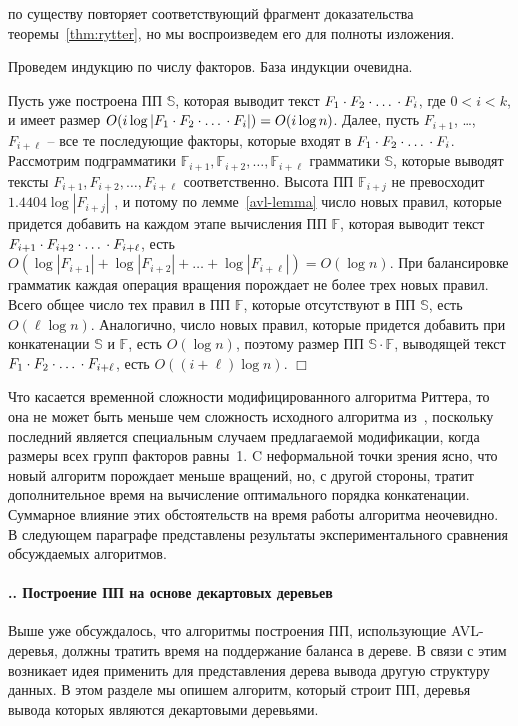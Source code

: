 ﻿\documentclass[11pt]{article}
\theoremstyle{remark}
\newcommand{\qqed}{\hfill$\Box$}
\newenvironment{proof1}{\trivlist\item[\hskip\labelsep{\bf Доказательство}] }{\qqed\endtrivlist}
\newcommand{\subsectionnew}[1]{
    \addtocounter{subsection}{1}
    \paragraph*{\arabic{section}.\arabic{subsection}. #1}
}
\newcommand{\slp}[1]{\mathbb{#1}}
\newcommand{\tuple}[4]{
    #1_{#2}, #1_{#3}, \dots, #1_{#4}
}
\newcommand{\concat}[4]{
    #1_{#2} \cdot #1_{#3} \cdot \mbox{\dots} \cdot #1_{#4}
}
\begin{document}
\begin{proof1} по существу повторяет соответствующий фрагмент доказательства теоремы~\ref{thm:rytter}, но мы воспроизведем его для полноты
изложения.

Проведем индукцию по числу факторов. База индукции очевидна.

Пусть уже построена ПП $\slp{S}$, которая выводит текст $\concat{F}{1}{2}{i}$, где $0 < i < k$, и имеет размер $O(i \log
|\concat{F}{1}{2}{i}|)=O(i \log n)$. Далее, пусть $F_{i+1}$, \dots, $F_{i+\ell}$ -- все те последующие факторы, которые входят в
$\concat{F}{1}{2}{i}$. Рассмотрим подграмматики $\tuple{\slp{F}}{i+1}{i+2}{i+\ell}$ грамматики $\slp{S}$, которые выводят тексты
$\tuple{F}{i+1}{i+2}{i+\ell}$ соответственно. Высота ПП $\slp{F}_{i+j}$ не превосходит $1.4404\log|F_{i+j}|$ \cite[теорема~6.2.3А]{Knuth},
и потому по лемме~\ref{avl-lemma} число новых правил, которые придется добавить на каждом этапе вычисления ПП $\slp{F}$, которая выводит
текст $\concat{F}{i+1}{i+2}{i+\ell}$, есть $O\left(\log |F_{i+1}| + \log |F_{i+2}| + \dots + \log |F_{i+\ell}|\right)=O(\log n)$. При
балансировке грамматик каждая операция вращения порождает не более трех новых правил. Всего общее число тех правил в ПП $\slp{F}$, которые
отсутствуют в ПП $\slp{S}$, есть $O(\ell\log n)$. Аналогично, число новых правил, которые придется добавить при конкатенации $\slp{S}$ и
$\slp{F}$, есть $O(\log n)$, поэтому размер ПП $\slp{S}\cdot\slp{F}$, выводящей текст $\concat{F}{1}{2}{i+\ell}$, есть $O((i+\ell)\log n)$.
\end{proof1}

Что касается временной сложности модифицированного алгоритма Риттера, то она не может быть меньше чем сложность исходного алгоритма
из~\cite{SLPConstruction}, поскольку последний является специальным случаем предлагаемой модификации, когда размеры всех групп факторов
равны~1. C неформальной точки зрения ясно, что новый алгоритм порождает меньше вращений, но, с другой стороны, тратит дополнительное время
на вычисление оптимального порядка конкатенации. Суммарное влияние этих обстоятельств на время работы алгоритма неочевидно. В следующем
параграфе представлены результаты экспериментального сравнения обсуждаемых алгоритмов.

\subsectionnew{Построение ПП на основе декартовых деревьев}

Выше уже обсуждалось, что алгоритмы построения ПП, использующие AVL-деревья, должны тратить время на поддержание баланса в дереве. В связи
с этим возникает идея применить для представления дерева вывода другую структуру данных. В этом разделе мы опишем алгоритм, который строит
ПП, деревья вывода которых являются декартовыми деревьями.
\end{document}
